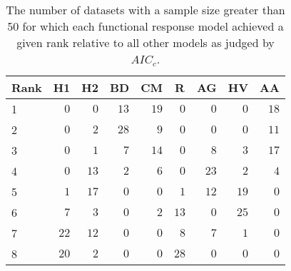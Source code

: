 \begin{table}[!tbp]
\caption{The number of datasets with a sample size greater than 50 for which each functional response model achieved a given rank relative to all other models as judged by $AIC_c$.\label{table:AICc_rankings_top50}} 
\begin{center}
\begin{tabular}{lrrrrrrrr}
\hline\hline
\multicolumn{1}{l}{Rank}&\multicolumn{1}{c}{H1}&\multicolumn{1}{c}{H2}&\multicolumn{1}{c}{BD}&\multicolumn{1}{c}{CM}&\multicolumn{1}{c}{R}&\multicolumn{1}{c}{AG}&\multicolumn{1}{c}{HV}&\multicolumn{1}{c}{AA}\tabularnewline
\hline
1&$ 0$&$ 0$&$13$&$19$&$ 0$&$ 0$&$ 0$&$18$\tabularnewline
2&$ 0$&$ 2$&$28$&$ 9$&$ 0$&$ 0$&$ 0$&$11$\tabularnewline
3&$ 0$&$ 1$&$ 7$&$14$&$ 0$&$ 8$&$ 3$&$17$\tabularnewline
4&$ 0$&$13$&$ 2$&$ 6$&$ 0$&$23$&$ 2$&$ 4$\tabularnewline
5&$ 1$&$17$&$ 0$&$ 0$&$ 1$&$12$&$19$&$ 0$\tabularnewline
6&$ 7$&$ 3$&$ 0$&$ 2$&$13$&$ 0$&$25$&$ 0$\tabularnewline
7&$22$&$12$&$ 0$&$ 0$&$ 8$&$ 7$&$ 1$&$ 0$\tabularnewline
8&$20$&$ 2$&$ 0$&$ 0$&$28$&$ 0$&$ 0$&$ 0$\tabularnewline
\hline
\end{tabular}\end{center}
\end{table}
